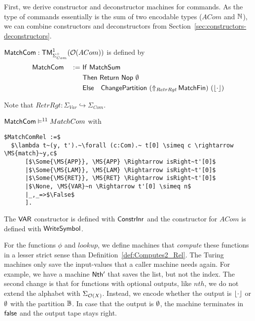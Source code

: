 First, we derive constructor and deconstructor machines for commands.  As the type of commands essentially is the sum of two encodable types ($ACom$
and $\Nat$), we can combine constructors and deconstructors from Section~\ref{sec:constructors-deconstructors}.
%
\begin{definition}[$\MS{MatchCom}$][MatchTok]
  $\MS{MatchCom} : \TM_{\Sigma^+_{Com}}^1(\Option(ACom))$ is defined by
  \begin{alignat*}{2}
    & \MS{MatchCom} &~:=~& \MS{If}~\MS{MatchSum} \\
    &               &    & \MS{Then}~   \Return{\Nop}{\None} \\
    &               &    & \MS{Else}~~~ \MS{ChangePartition}~(\LiftAlphabet{\MS{MatchFin}}{RetrRgt})~(\Some\cdot)
  \end{alignat*}
\end{definition}
Note that $RetrRgt : \Sigma_{Var} \hookrightarrow \Sigma_{Com}$.
\begin{lemma}
  \label{lem:MatchCom_Sem}
  $\MS{MatchCom} \RealiseIn{11} MatchCom$ with
\begin{lstlisting}[style=semicoqstyle]
$MatchComRel :=$
  $\lambda t~(y, t').~\forall (c:Com).~ t[0] \simeq c \rightarrow \MS{match}~y,c$
      [$\Some{\MS{APP}}, \MS{APP} \Rightarrow isRight~t'[0]$
      |$\Some{\MS{LAM}}, \MS{LAM} \Rightarrow isRight~t'[0]$
      |$\Some{\MS{RET}}, \MS{RET} \Rightarrow isRight~t'[0]$
      |$\None, \MS{VAR}~n \Rightarrow t'[0] \simeq n$
      |_,_=>$\False$
      ].
\end{lstlisting}
\end{lemma}
The $\MS{VAR}$ constructor is defined with $\MS{ConstrInr}$ and the constructor for $ACom$ is defined with $\MS{WriteSymbol}$.

For the functions $\phi$ and $lookup$, we define machines that \textit{compute} these functions in a lesser strict sense than
Definition~\ref{def:Computes2_Rel}.  The Turing machines only save the input-values that a caller machine needs again.  For example, we have a machine
$\MS{Nth'}$ that saves the list, but not the index.  The second change is that for functions with optional outputs, like $nth$, we do not extend the
alphabet with $\Sigma_{\Option(X)}$.  Instead, we encode whether the output is $\Some{\cdot}$ or $\None$ with the partition $\Bool$.  In case that the
output is $\None$, the machine terminates in $\false$ and the output tape stays right.

